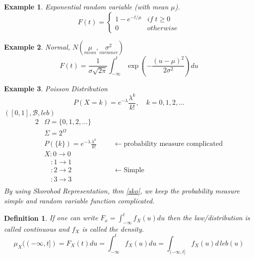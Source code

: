 \documentclass[12pt]{article}
\newtheorem{definition}{Definition}[section]
\newtheorem{example}{Example}[section]
\begin{document}
\begin{example}
Exponential random variable (with mean $\mu$). 
\[F(t) = \begin{cases}
1-e^{ - t/\mu} &if \;  t\geq 0\\
0 & otherwise \end{cases} \]
\end{example}

\begin{example} Normal, $N(\underset{mean}{\mu}, \underset{variance}{\sigma^2})$
\[F(t) = \frac{1}{\sigma \sqrt{2\pi}}\int_{-\infty}^{t}\exp(- \frac{(u-\mu)^2}{2 \sigma^2})du\]
\end{example}

\begin{example}
Poisson Distribution
\[P(X=k) = e^{-\lambda}\frac{\lambda^k}{k!}, \quad k=0,1,2,\dots\]
$([0,1], \mathcal{B}, leb)$ \begin{alignat*}{2}
&\Omega = \{0,1,2,\dots \} &\quad &\quad\\
&\Sigma = 2^{\Omega} &\quad &\quad\\
&P(\{k\}) = e^{-\lambda}\frac{\lambda^k}{k!} &\quad & \leftarrow \; \text{probability measure complicated}\\
&X: 0 \rightarrow 0 &\quad &\quad\\
& \; \; \: \, : 1 \rightarrow 1 &\quad &\quad\\
&\; \; \: \, : 2 \rightarrow 2 &\quad & \leftarrow \; \text{Simple}\\
& \; \; \: \, :3 \rightarrow 3 &\quad &\quad\\
\end{alignat*}
By using Skorohod Representation, thm \ref{sko}, we keep the probability measure simple and random variable function complicated. 
\end{example}

\begin{definition} If one can write $F_x = \int_{-\infty}^{t}f_X(u)du$ then the law/distribution is called continuous and $f_X$ is called the density.
\[\mu_X((-\infty, t])= F_X(t)du =  \int_{-\infty}^{t}f_X(u)du =  \int_{(-\infty, t]}f_X(u)d\, leb(u)\]
\end{definition}
\end{document}
